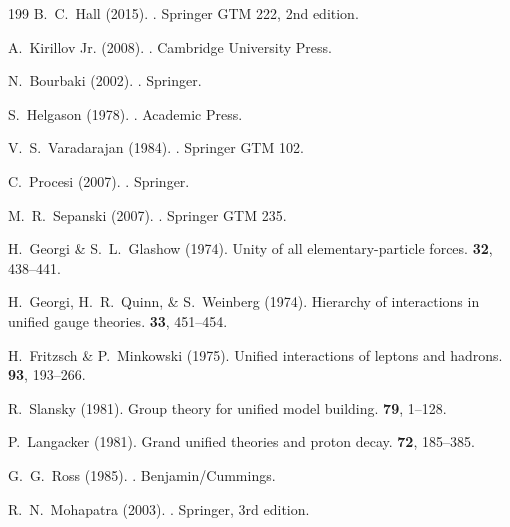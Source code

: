 \documentclass[11pt,a4paper,openright]{book}
\theoremstyle{plain}
\theoremstyle{definition}
\begin{document}
\begin{thebibliography}{199}
B.~C.~Hall (2015).
.
\newblock Springer GTM 222, 2nd edition.

A.~Kirillov Jr. (2008).
.
\newblock Cambridge University Press.

N.~Bourbaki (2002).
.
\newblock Springer.

S.~Helgason (1978).
.
\newblock Academic Press.

V.~S.~Varadarajan (1984).
.
\newblock Springer GTM 102.

C.~Procesi (2007).
.
\newblock Springer.

M.~R.~Sepanski (2007).
.
\newblock Springer GTM 235.


H.~Georgi \& S.~L.~Glashow (1974).
\newblock Unity of all elementary-particle forces.
 {\bf 32}, 438--441.

H.~Georgi, H.~R.~Quinn, \& S.~Weinberg (1974).
\newblock Hierarchy of interactions in unified gauge theories.
 {\bf 33}, 451--454.

H.~Fritzsch \& P.~Minkowski (1975).
\newblock Unified interactions of leptons and hadrons.
 {\bf 93}, 193--266.

R.~Slansky (1981).
\newblock Group theory for unified model building.
 {\bf 79}, 1--128.

P.~Langacker (1981).
\newblock Grand unified theories and proton decay.
 {\bf 72}, 185--385.

G.~G.~Ross (1985).
.
\newblock Benjamin/Cummings.

R.~N.~Mohapatra (2003).
.
\newblock Springer, 3rd edition.


\end{thebibliography}
\end{document}
